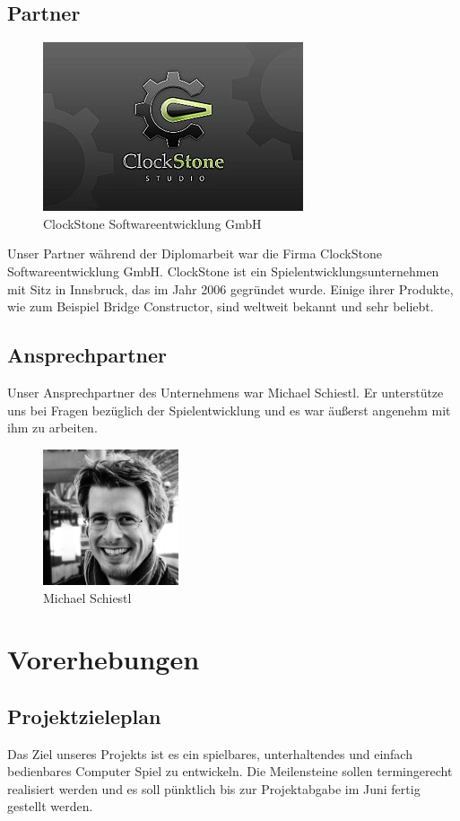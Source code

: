 \newpage
\subsection{Partner}
\begin{figure}[H]
	\centering
	\includegraphics[]{images/ClockstoneLogo.png}
	\caption{ClockStone Softwareentwicklung GmbH}
\end{figure}
Unser Partner während der Diplomarbeit war die Firma ClockStone Softwareentwicklung GmbH. ClockStone ist ein Spielentwicklungsunternehmen mit Sitz in Innsbruck, das im Jahr 2006 gegründet wurde. Einige ihrer Produkte, wie zum Beispiel Bridge Constructor, sind weltweit bekannt und sehr beliebt. 


\subsection{Ansprechpartner}
Unser Ansprechpartner des Unternehmens war Michael Schiestl. Er unterstütze uns bei Fragen bezüglich der Spielentwicklung und es war äußerst angenehm mit ihm zu arbeiten.

\begin{figure}[H]
	\centering
	\includegraphics[width=4cm, height=4cm]{images/michaelschiestl.jpg}
	\caption{Michael Schiestl}
\end{figure}
\section{Vorerhebungen}
\subsection{Projektzieleplan}
\def \currentAuthor {Michael Leitner} Das Ziel unseres Projekts ist es ein spielbares, unterhaltendes und einfach bedienbares Computer Spiel zu entwickeln. Die Meilensteine sollen termingerecht realisiert werden und es soll pünktlich bis zur Projektabgabe im Juni fertig gestellt werden.
\newpage

